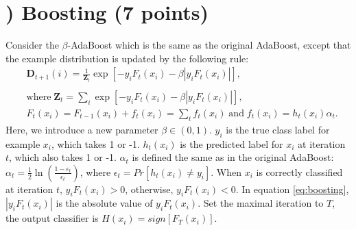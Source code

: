 \documentclass[11pt]{article}
\newcounter{QuestionCounter}
\newcounter{SubQuestionCounter}[QuestionCounter]
\newcommand{\newquestion}{\stepcounter{QuestionCounter}\setcounter{SubQuestionCounter}{1}\newpage}
\begin{document}
\newquestion
\section*{) 
Boosting (7 points)} 
Consider the $\beta$-AdaBoost which is the same as the original AdaBoost, except that the example distribution is updated by the following rule:
\begin{align}\label{eq:boosting}
    &\mathbf{D}_{t+1}(i) = \frac{1}{\mathbf{Z}_t} \exp[-y_iF_t(x_i)-\beta|y_iF_t(x_i)|],\\\nonumber\\
    &\text{where}\; \mathbf{Z}_t = \sum_i\exp[-y_iF_t(x_i)-\beta|y_iF_t(x_i)|],\nonumber\\
    &F_t(x_i) = F_{t-1}(x_i) + f_t(x_i) = \sum_tf_t(x_i)  \; \text{and} \; f_t(x_i)=h_t(x_i)\alpha_t. \nonumber
\end{align}
Here, we introduce a new parameter $\beta\in(0,1)$. $y_i$ is the true class label for example $x_i$, which takes 1 or -1. $h_t(x_i)$ is the predicted label for $x_i$ at iteration $t$, which also takes 1 or -1. $\alpha_t$ is defined the same as in the original AdaBoost: $\alpha_t=\frac{1}{2}\ln(\frac{1-\epsilon_t}{\epsilon_t})$, where $\epsilon_t=Pr[h_t(x_i)\neq y_i]$. When $x_i$ is correctly classified at iteration $t$, $y_iF_t(x_i)>0$, otherwise, $y_iF_t(x_i)<0$. In equation \ref{eq:boosting}, $|y_iF_t(x_i)|$ is the absolute value of $y_iF_t(x_i)$. Set the maximal iteration to $T$, the output classifier is $H(x_i)=sign[F_T(x_i)]$.
\end{document}
